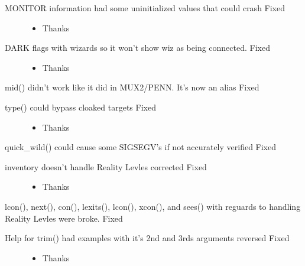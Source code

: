 \documentclass[letterpaper,10pt,english]{sphinxmanual}
\begin{document}
\begin{description}
\begin{itemize}
\end{itemize}

\item[{MONITOR information had some uninitialized values that could crash \sphinxhyphen{} Fixed}] \leavevmode\begin{itemize}
\item {} 
\sphinxAtStartPar
Thanks 

\end{itemize}

\item[{DARK flags with wizards so it won’t show wiz as being connected. \sphinxhyphen{} Fixed}] \leavevmode\begin{itemize}
\item {} 
\sphinxAtStartPar
Thanks 

\end{itemize}

\end{description}

\sphinxAtStartPar
mid() didn’t work like it did in MUX2/PENN.  It’s now an alias \sphinxhyphen{} Fixed
\begin{description}
\item[{type() could bypass cloaked targets \sphinxhyphen{} Fixed}] \leavevmode\begin{itemize}
\item {} 
\sphinxAtStartPar
Thanks 

\end{itemize}

\end{description}

\sphinxAtStartPar
quick\_wild() could cause some SIGSEGV’s if not accurately verified \sphinxhyphen{} Fixed
\begin{description}
\item[{inventory doesn’t handle Reality Levles corrected \sphinxhyphen{} Fixed}] \leavevmode\begin{itemize}
\item {} 
\sphinxAtStartPar
Thanks 

\end{itemize}

\end{description}

\sphinxAtStartPar
lcon(), next(), con(), lexits(), lcon(), xcon(), and sees() with reguards to handling Reality Levles were broke. \sphinxhyphen{} Fixed
\begin{description}
\item[{Help for trim() had examples with it’s 2nd and 3rds arguments reversed \sphinxhyphen{} Fixed}] \leavevmode\begin{itemize}
\item {} 
\sphinxAtStartPar
Thanks 

\end{itemize}

\end{description}
\end{document}
